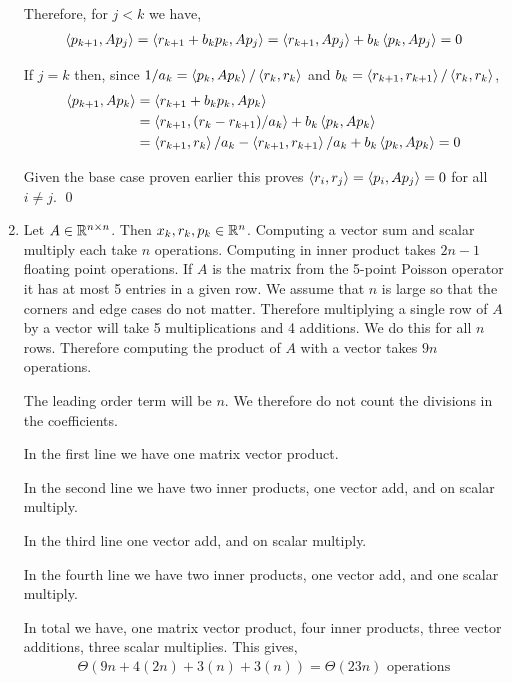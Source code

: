 \documentclass[10pt]{article}
\begin{document}
\begin{solution}[Solution]
\begin{enumerate}[label=(\alph*)]
        Therefore, for \( j < k \) we have,
        \begin{align*}
            \left\langle p_{k+1}, A p_j \right\rangle 
            = \left\langle r_{k+1} + b_kp_k, A p_j \right\rangle
            = \left\langle r_{k+1}, Ap_j \right\rangle + b_k \left\langle p_k,Ap_j \right\rangle
            = 0 
        \end{align*}

        If \( j = k \) then, since \( 1/a_k = \left\langle p_k,Ap_k \right\rangle/\left\langle r_k,r_k \right\rangle \) and \( b_k = \left\langle r_{k+1},r_{k+1} \right\rangle/\left\langle r_k,r_k \right\rangle \),
        \begin{align*}
            \left\langle p_{k+1},A p_k \right\rangle 
            &= \left\langle r_{k+1}+b_kp_k,Ap_k \right\rangle
            \\&= \left\langle r_{k+1},(r_k-r_{k+1})/a_k \right\rangle + b_k\left\langle p_k,Ap_k \right\rangle
            \\&= \left\langle r_{k+1},r_k \right\rangle/a_k - \left\langle r_{k+1},r_{k+1} \right\rangle/a_k + b_k\left\langle p_k,Ap_k \right\rangle
            = 0 
        \end{align*} 

        Given the base case proven earlier this proves \( \left\langle r_i,r_j \right\rangle = \left\langle p_i, Ap_j \right\rangle = 0 \) for all \( i\neq j \). \qed

    \item 
        Let \( A\in \mathbb{R}^{n\times n} \). Then \( x_k, r_k, p_k \in \mathbb{R}^n \). Computing a vector sum and scalar multiply each take \( n \) operations. Computing in inner product takes  \( 2n-1 \) floating point operations. If \( A \) is the matrix from the 5-point Poisson operator it has at most 5 entries in a given row. We assume that \( n \) is large so that the corners and edge cases do not matter. Therefore multiplying a single row of \( A \) by a vector will take 5 multiplications and 4 additions. We do this for all \( n \) rows. Therefore computing the product of \( A \) with a vector takes \( 9n \) operations.

The leading order term will be \( n \). We therefore do not count the divisions in the coefficients.

In the first line we have one matrix vector product.

In the second line we have two inner products, one vector add, and on scalar multiply.

In the third line one vector add, and on scalar multiply.

In the fourth line we have two inner products, one vector add, and one scalar multiply.

In total we have, one matrix vector product, four inner products, three vector additions, three scalar multiplies.
This gives,
\begin{align*}
    \Theta (9n + 4(2n) + 3(n) + 3(n)) = \Theta(23n) \text{ operations}
\end{align*}


\end{enumerate}
\end{solution}
\end{document}
